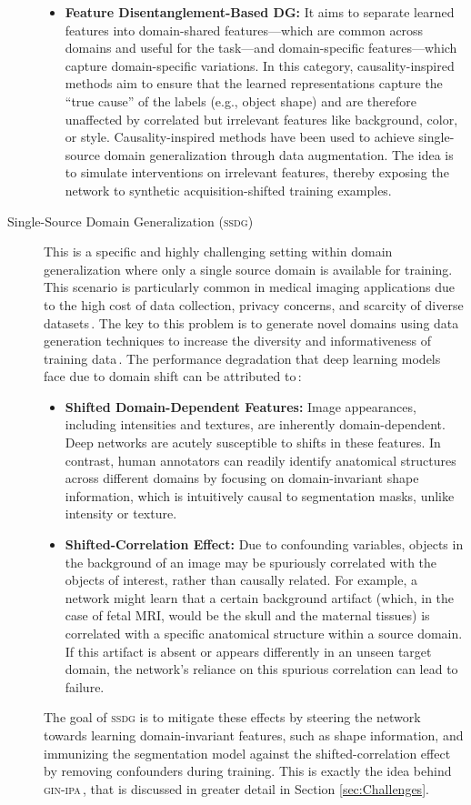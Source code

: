 \begin{description}
\begin{itemize}
        \item \textbf{Feature Disentanglement-Based DG:} It aims to separate learned features into domain-shared features---which are common across domains and useful for the task---and domain-specific features---which capture domain-specific variations. In this category, causality-inspired methods aim to ensure that the learned representations capture the \enquote{true cause} of the labels (e.g., object shape) and are therefore unaffected by correlated but irrelevant features like background, color, or style. Causality-inspired methods have been used to achieve single-source domain generalization through data augmentation. The idea is to simulate interventions on irrelevant features, thereby exposing the network to synthetic acquisition-shifted training examples.
    \end{itemize}
    \item[Single-Source Domain Generalization (\textsc{ssdg})] This is a specific and highly challenging setting within domain generalization where only a single source domain is available for training. This scenario is particularly common in medical imaging applications due to the high cost of data collection, privacy concerns, and scarcity of diverse datasets\,\cite{Ouyang2023}. The key to this problem is to generate novel domains using data generation techniques to increase the diversity and informativeness of training data\,\cite{Wang2023}. The performance degradation that deep learning models face due to domain shift can be attributed to\,\cite{Ouyang2023}:
    \begin{itemize}
        \item \textbf{Shifted Domain-Dependent Features:} Image appearances, including intensities and textures, are inherently domain-dependent. Deep networks are acutely susceptible to shifts in these features. In contrast, human annotators can readily identify anatomical structures across different domains by focusing on domain-invariant shape information, which is intuitively causal to segmentation masks, unlike intensity or texture.
        \item \textbf{Shifted-Correlation Effect:} Due to confounding variables, objects in the background of an image may be spuriously correlated with the objects of interest, rather than causally related. For example, a network might learn that a certain background artifact (which, in the case of fetal MRI, would be the skull and the maternal tissues) is correlated with a specific anatomical structure within a source domain. If this artifact is absent or appears differently in an unseen target domain, the network's reliance on this spurious correlation can lead to failure.
    \end{itemize}
The goal of \textsc{ssdg} is to mitigate these effects by steering the network towards learning domain-invariant features, such as shape information, and immunizing the segmentation model against the shifted-correlation effect by removing confounders during training. This is exactly the idea behind \textsc{gin-ipa}\,\cite{Ouyang2023}, that is discussed in greater detail in Section \ref{sec:Challenges}.
\end{description}


